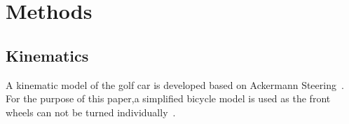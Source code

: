 
\section{Methods}\label{sec:Methods}

\subsection{Kinematics}\label{subsec:Kinematics}

A kinematic model of the golf car is developed based on Ackermann Steering~\cite{VehicleDynamics}.
For the purpose of this paper,a simplified bicycle model is used as the front wheels can not be turned individually~\cite{VehicleDynamics}.